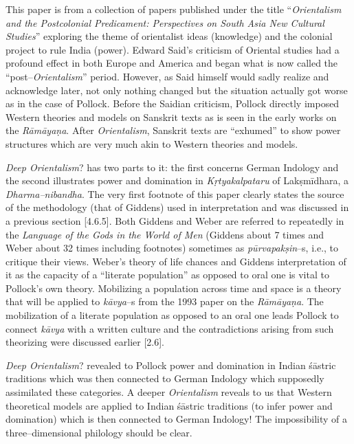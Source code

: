 \newpage

This paper is from a collection of papers published under the title “\textit{Orientalism and the Postcolonial Predicament: Perspectives on South Asia New Cultural Studies}” exploring the theme of orientalist ideas (knowledge) and the colonial project to rule India (power). Edward Said’s criticism of Oriental studies had a profound effect in both Europe and America and began what is now called the “post–\textit{Orientalism}” period. However, as Said himself would sadly realize and acknowledge later, not only nothing changed but the situation actually got worse as in the case of Pollock. Before the Saidian criticism, Pollock directly imposed Western theories and models on Sanskrit texts as is seen in the early works on the \textit{Rāmāyaṇa}. After \textit{Orientalism}, Sanskrit texts are “exhumed” to show power structures which are very much akin to Western theories and models.

\textit{Deep Orientalism}? has two parts to it: the first concerns German Indology and the second illustrates power and domination in \textit{Kṛtyakalpataru} of Lakṣmīdhara, a \textit{Dharma–nibandha}. The very first footnote of this paper clearly states the source of the methodology (that of Giddens) used in interpretation and was discussed in a previous section [4.6.5]. Both Giddens and Weber are referred to repeatedly in the \textit{Language of the Gods in the World of Men }(Giddens about 7 times and Weber about 32 times including footnotes) sometimes as \textit{pūrvapakṣin}–s, i.e., to critique their views. Weber’s theory of life chances and Giddens interpretation of it as the capacity of a “literate population” as opposed to oral one is vital to Pollock’s own theory. Mobilizing a population across time and space is a theory that will be applied to \textit{kāvya}–s from the 1993 paper on the\textit{ Rāmāyaṇa}. The mobilization of a literate population as opposed to an oral one leads Pollock to connect \textit{kāvya} with a written culture and the contradictions arising from such theorizing were discussed earlier [2.6].

\textit{Deep Orientalism}? revealed to Pollock power and domination in Indian śāstric traditions which was then connected to German Indology which supposedly assimilated these categories. A deeper\textit{ Orientalism} reveals to us that Western theoretical models are applied to Indian śāstric traditions (to infer power and domination) which is then connected to German Indology! The impossibility of a three–dimensional philology should be clear.

